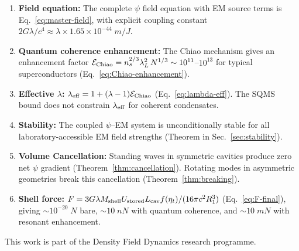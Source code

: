 \documentclass[aps,prd,twocolumn,superscriptaddress,floatfix,nofootinbib]{revtex4-2}
\newcommand{\lam}{\lambda}
\begin{document}
\begin{enumerate}
\item \textbf{Field equation:} The complete $\psi$ field equation with
EM source terms is Eq.~\eqref{eq:master-field}, with explicit coupling
constant $2G\lam/c^4 \approx \lam \times 1.65 \times 10^{-44}\;\si{m/J}$.

\item \textbf{Quantum coherence enhancement:} The Chiao mechanism
gives an enhancement factor
$\mathcal{E}_{\rm Chiao} = n_s^{2/3}\lambda_L^2\,N^{1/3}
\sim 10^{11}$--$10^{13}$ for typical superconductors
(Eq.~\eqref{eq:Chiao-enhancement}).

\item \textbf{Effective $\lambda$:}
$\lam_{\rm eff} = 1 + (\lam - 1)\mathcal{E}_{\rm Chiao}$
(Eq.~\eqref{eq:lambda-eff}). The SQMS bound does not constrain
$\lam_{\rm eff}$ for coherent condensates.

\item \textbf{Stability:} The coupled $\psi$--EM system is
unconditionally stable for all laboratory-accessible EM field
strengths (Theorem in Sec.~\ref{sec:stability}).

\item \textbf{Volume Cancellation:} Standing waves in symmetric
cavities produce zero net $\psi$ gradient (Theorem~\ref{thm:cancellation}).
Rotating modes in asymmetric geometries break this cancellation
(Theorem~\ref{thm:breaking}).

\item \textbf{Shell force:}
$F = 3G\lam M_{\rm shell} U_{\rm stored} L_{\rm cav}
f(\eta_t)/(16\pi c^2 R_1^3)$
(Eq.~\eqref{eq:F-final}), giving $\sim 10^{-20}\;\si{N}$ bare,
$\sim 10\;\si{nN}$ with quantum coherence, and $\sim 10\;\si{mN}$
with resonant enhancement.
\end{enumerate}


\begin{acknowledgments}
This work is part of the Density Field Dynamics research programme.
\end{acknowledgments}
\end{document}
